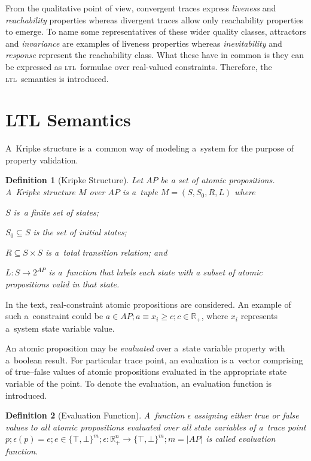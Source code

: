 \documentclass[12pt,twoside,draft]{fithesis}
\newcommand{\ltl}{\textsc{ltl}~}
\newcommand{\mReal}{\mathbb{R}}
\newtheorem{mydef}{Definition}
\begin{document}
From the qualitative point of view, convergent traces express
\emph{liveness} and \emph{reachability} properties whereas
divergent traces allow only reachability properties to emerge.
To name some representatives of these wider quality classes,
attractors and  \emph{invariance} are examples of liveness
properties whereas \emph{inevitability} and \emph{response} represent
the reachability class\cite{rizk}. What these have in common is they
can be expressed as \ltl formulae over real-valued
constraints\cite{sven}. Therefore, the \ltl semantics is introduced.

\section{LTL Semantics}
A~Kripke structure is a~common way of modeling a~system for the purpose
of property validation\cite{clarke}.
\begin{mydef}[Kripke Structure]
Let ${AP}$ be a set of atomic propositions.
A~Kripke structure $M$ over $AP$ is a~tuple
$M=(S, S_0, R, L)$ where
\begin{inparaenum}
	\item{}$S$ is~a finite set of states;
	\item{}$S_0\subseteq{}S$ is the set of initial states;
	\item{}$R\subseteq{}S\times{}S$ is a~total transition relation; and
	\item{}$L:S\rightarrow{}2^{AP}$ is a~function that labels each state
		with a subset of atomic propositions valid in that state.
\end{inparaenum}
\end{mydef}
In the text, real-constraint atomic propositions are considered.
An example of such a~constraint could be
$a\in AP;a\equiv x_i \geq c;c\in\mReal_{+}$, where $x_i$ represents
a~system state variable value.

An atomic proposition may be \emph{evaluated}
over a~state variable property with a~boolean result. For particular
trace point, an evaluation is a~vector comprising of true--false values
of atomic propositions evaluated in the appropriate state variable of
the point. To denote the evaluation, an evaluation function is
introduced.
\begin{mydef}[Evaluation Function]
A~function $\epsilon$ assigning either true or false values to
all atomic propositions evaluated over all state variables of a~trace
point $p;\epsilon(p)=e;e\in\{\top,\bot\}^m; \epsilon:\mReal_{+}^n
\rightarrow\{\top,\bot\}^m;m=|AP|$ is called evaluation function.
\end{mydef}
\end{document}
